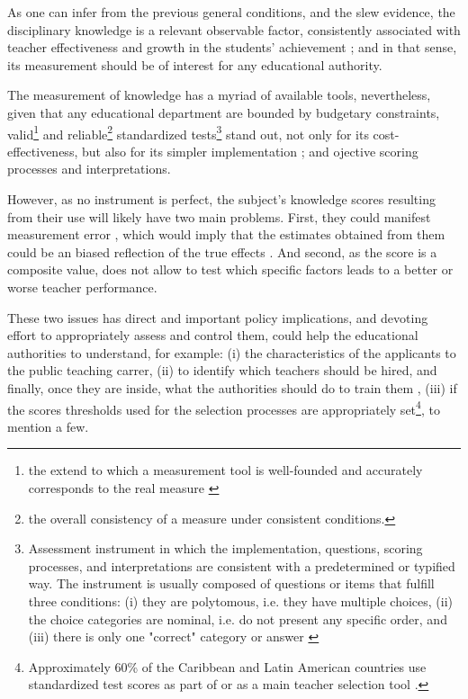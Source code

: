 As one can infer from the previous general conditions, and the slew evidence, the disciplinary knowledge is a relevant observable factor, consistently associated with teacher effectiveness and growth in the students' achievement \cite{Santibanez_2006, Clotfelter_et_al_2006, Clotfelter_et_al_2007, Hanushek_et_al_2006, Marshall_2009, Rockoff_et_al_2011, Kane_et_al_2011, Kane_et_al_2012, Ome_2012, Metzler_et_al_2012, Kane_et_al_2013, Araujo_et_al_2016, Bietenbeck_et_al_2018, Estrada_2019}; and in that sense, its measurement should be of interest for any educational authority.

The measurement of knowledge has a myriad of available tools, nevertheless, given that any educational department are bounded by budgetary constraints, valid\footnote{the extend to which a measurement tool is well-founded and accurately corresponds to the real measure \cite{Kelley_1927}} and reliable\footnote{the overall consistency of a measure under consistent conditions.} standardized tests\footnote{Assessment instrument in which the implementation, questions, scoring processes, and interpretations are consistent with a predetermined or typified way. The instrument is usually composed of questions or items that fulfill three conditions: (i) they are polytomous, i.e. they have multiple choices, (ii) the choice categories are nominal, i.e. do not present any specific order, and (iii) there is only one "correct" category or answer \cite{Rivera_2019}} stand out, not only for its cost-effectiveness, but also for its simpler implementation \cite{Hincapie_et_al_2020}; and ojective scoring processes and interpretations.

However, as no instrument is perfect, the subject's knowledge scores resulting  from their use will likely have two main problems. First, they could manifest measurement error \cite{Metzler_et_al_2012}, which would imply that the estimates obtained from them could be an biased reflection of the true effects \cite{Angrist_et_al_1999}. And second, as the score is a composite value, does not allow to test which specific factors leads to a better or worse teacher performance.

These two issues has direct and important policy implications, and devoting effort to appropriately assess and control them, could help the educational authorities to understand, for example: (i) the characteristics of the applicants to the public teaching carrer, (ii) to identify which teachers should be hired, and finally, once they are inside, what the authorities should do to train them \cite{Hanushek_et_al_2012}, (iii) if the scores thresholds used for the selection processes are appropriately set\footnote{Approximately 60\% of the Caribbean and Latin American countries use standardized test scores as part of or as a main teacher selection tool \cite{Hincapie_et_al_2020}.}, to mention a few.



